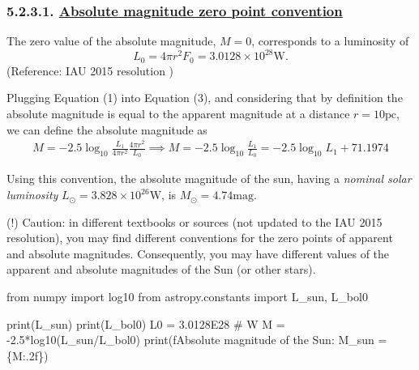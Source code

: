 \documentclass[
  letterpaper,
  DIV=11,
  numbers=noendperiod]{scrreprt}
\newenvironment{Shaded}{\begin{snugshade}}{\end{snugshade}}
\newcommand{\BuiltInTok}[1]{\textcolor[rgb]{0.00,0.23,0.31}{#1}}
\newcommand{\CommentTok}[1]{\textcolor[rgb]{0.37,0.37,0.37}{#1}}
\newcommand{\FloatTok}[1]{\textcolor[rgb]{0.68,0.00,0.00}{#1}}
\newcommand{\ImportTok}[1]{\textcolor[rgb]{0.00,0.46,0.62}{#1}}
\newcommand{\NormalTok}[1]{\textcolor[rgb]{0.00,0.23,0.31}{#1}}
\newcommand{\OperatorTok}[1]{\textcolor[rgb]{0.37,0.37,0.37}{#1}}
\newcommand{\SpecialCharTok}[1]{\textcolor[rgb]{0.37,0.37,0.37}{#1}}
\newcommand{\SpecialStringTok}[1]{\textcolor[rgb]{0.13,0.47,0.30}{#1}}
\begin{document}
\hypertarget{absolute-magnitude-zero-point-convention}{%
\subsubsection{\texorpdfstring{5.2.3.1.
\protect\hyperlink{toc0_}{Absolute magnitude zero point
convention}}{5.2.3.1. Absolute magnitude zero point convention}}\label{absolute-magnitude-zero-point-convention}}

The zero value of the absolute magnitude, \(M=0\), corresponds to a
luminosity of
\[ L_0 = 4\pi r^2 F_0 = 3.0128 \times 10^{28} \mathrm{W}.\] (Reference:
IAU 2015 resolution )

Plugging Equation (1) into Equation (3), and considering that by
definition the absolute magnitude is equal to the apparent magnitude at
a distance \(r=10\mathrm{pc}\), we can define the absolute magnitude as
\begin{align}
M = -2.5\log_{10}{\frac{L_1}{4\pi r^2}\frac{4 \pi r^2}{L_0}} \implies M = -2.5 \log_{10}{\frac{L_1}{L_0}} = -2.5\log_{10} L_1 + 71.1974
\end{align}

Using this convention, the absolute magnitude of the sun, having a
\emph{nominal solar luminosity}
\(L_\odot = 3.828 \times 10^{26} \mathrm{W}\), is
\(M_\odot = 4.74\mathrm{mag}.\)

(!) Caution: in different textbooks or sources (not updated to the IAU
2015 resolution), you may find different conventions for the zero points
of apparent and absolute magnitudes. Consequently, you may have
different values of the apparent and absolute magnitudes of the Sun (or
other stars).

\begin{Shaded}
\begin{Highlighting}[]
\ImportTok{from}\NormalTok{ numpy }\ImportTok{import}\NormalTok{ log10}
\ImportTok{from}\NormalTok{ astropy.constants }\ImportTok{import}\NormalTok{ L\_sun, L\_bol0}

\BuiltInTok{print}\NormalTok{(L\_sun)}
\BuiltInTok{print}\NormalTok{(L\_bol0)}
\NormalTok{L0 }\OperatorTok{=} \FloatTok{3.0128E28} \CommentTok{\# W}
\NormalTok{M }\OperatorTok{=} \OperatorTok{{-}}\FloatTok{2.5}\OperatorTok{*}\NormalTok{log10(L\_sun}\OperatorTok{/}\NormalTok{L\_bol0)}
\BuiltInTok{print}\NormalTok{(}\SpecialStringTok{f\textquotesingle{}Absolute magnitude of the Sun: M\_sun = }\SpecialCharTok{\{}\NormalTok{M}\SpecialCharTok{:.2f\}}\SpecialStringTok{\textquotesingle{}}\NormalTok{)}
\end{Highlighting}
\end{Shaded}
\end{document}
